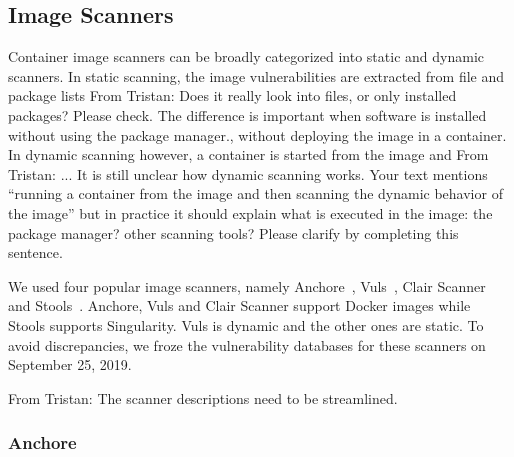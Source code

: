 \documentclass[a4paper,num-refs]{oup-contemporary}
\newcommand{\tristan}[1]{\color{blue}From Tristan: #1\color{black}}
\begin{document}
\subsection{Image Scanners}

Container image scanners can be broadly categorized into static and dynamic
scanners. In static scanning, the image vulnerabilities are extracted from
file and package lists \tristan{Does it really look into files, or only installed packages? Please check. The difference is important 
when software is installed without using the package manager.}, without deploying the image in a container. In
dynamic scanning however, a container is started from the image and
\tristan{... It is still unclear how dynamic scanning works. Your text
mentions ``running a container from the image and then scanning the dynamic
behavior of the image'' but in practice it should explain what is executed
in the image: the package manager? other scanning tools? Please clarify by
completing this sentence.}



We used four popular image scanners, namely Anchore~\cite{github_2019},
Vuls~\cite{future-architect_2019}, Clair Scanner~\cite{arminc_2019} and
Stools~\cite{refneeded}. Anchore, Vuls and Clair Scanner support Docker
images while Stools supports Singularity. Vuls is dynamic and the other
ones are static. To avoid discrepancies, we froze the vulnerability
databases for these scanners on September 25, 2019.


\tristan{The scanner descriptions need to be streamlined.}

\subsubsection{Anchore}
\end{document}
